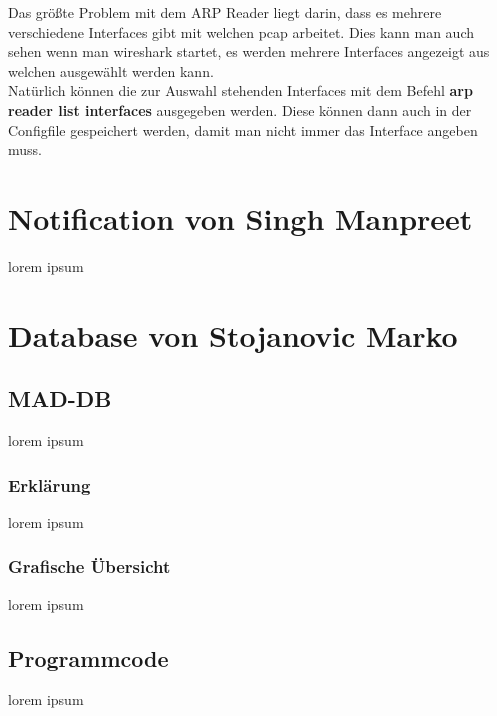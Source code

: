 \documentclass[12pt,a4paper]{report}
\begin{document}
Das größte Problem mit dem ARP Reader liegt darin, dass es mehrere verschiedene Interfaces gibt mit welchen pcap arbeitet. Dies kann man auch sehen wenn man wireshark startet, es werden mehrere Interfaces angezeigt aus welchen ausgewählt werden kann.\\
Natürlich können die zur Auswahl stehenden Interfaces mit dem Befehl \textbf{arp reader list interfaces} ausgegeben werden. Diese können dann auch in der Configfile gespeichert werden, damit man nicht immer das Interface angeben muss.
\chapter{Notification von Singh Manpreet}
lorem ipsum

\chapter{Database von Stojanovic Marko}
\section{MAD-DB}
lorem ipsum
\subsection{Erklärung}
lorem ipsum
\subsection{Grafische Übersicht}
lorem ipsum
\section{Programmcode}
lorem ipsum

\end{document}
